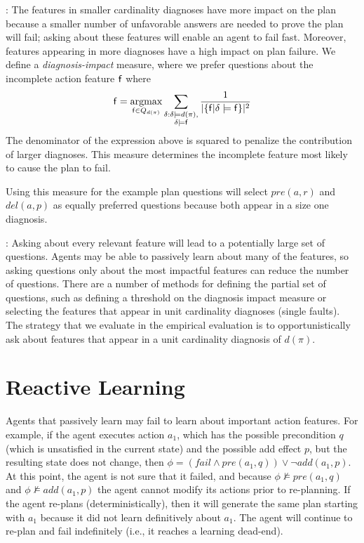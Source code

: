 \documentclass[letterpaper]{article}
\def\und#1{\noindent{\bf #1}:}
\begin{document}
\und{Ranking Relevant Questions}  
The features in smaller cardinality diagnoses have more impact on the plan
because a smaller number of unfavorable answers are needed to prove the plan
will fail; asking about these features will enable an agent to fail fast. 
Moreover, features appearing in more diagnoses have a high impact on plan
failure.  We define a {\em diagnosis-impact}  measure, where we prefer questions
about the incomplete action feature ${\sf f}$ where
\begin{align}
{\sf f} = \underset{{\sf f}  \in Q_{d(\pi)}}{\operatorname{argmax}}
\sum\limits_{\substack{\delta : \delta \models d(\pi),\\ \delta\models {\sf
f}}}
\frac{1}{|\{{\sf f}| \delta \models {\sf f}\}|^2}
\notag 
\end{align}
The denominator of the expression above is squared to penalize the contribution
of larger diagnoses.  This measure determines the incomplete feature most
likely to cause the plan to fail.

Using this measure for the example plan questions will select $pre(a, r)$ and
$del(a, p)$ as equally preferred questions because both appear in a size one diagnosis.


\und{Partial Proactivity} Asking about every relevant feature will lead to a
potentially large set of questions.  Agents may be able to passively learn
about many of the features, so asking questions only about the most impactful
features can reduce the number of questions.  There are a number of methods for
defining the partial set of questions, such as defining a threshold on the
diagnosis impact measure or selecting the features that appear in unit
cardinality diagnoses (single faults).  The strategy that we evaluate in the
empirical evaluation is to opportunistically ask about features that appear in a
unit cardinality diagnosis of $d(\pi)$.


\section{Reactive Learning}

Agents that passively learn may fail to learn about important action features. 
For example, if the agent executes action $a_1$, which has the possible
precondition $q$ (which is unsatisfied in the current state) and the possible
add effect $p$, but the resulting state does not change, then $\phi = (fail \wedge pre(a_1, q)) \vee
\neg add(a_1, p)$.  At this point, the agent is not sure that it failed, and
because $\phi \not\models  pre(a_1, q)$ and $\phi \not\models add(a_1, p)$ the
agent cannot modify its actions prior to re-planning. If the agent re-plans
(deterministically), then it will generate the same plan starting with $a_1$
because it did not learn definitively about $a_1$.  The agent will continue to
re-plan and fail indefinitely (i.e., it reaches a learning dead-end).
\end{document}
